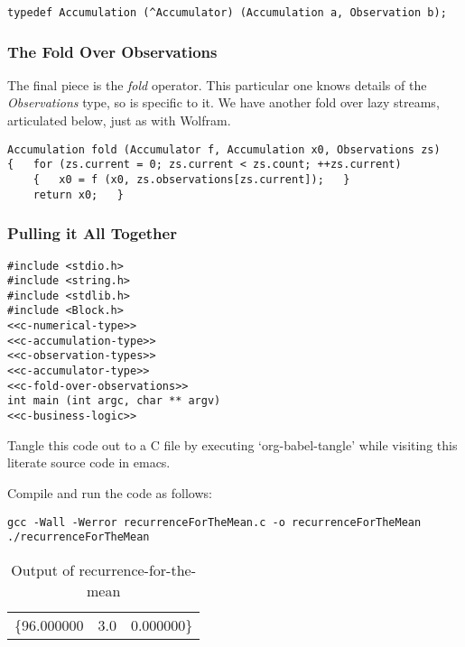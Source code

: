 \documentclass[10pt,oneside,x11names]{article}
\begin{document}
\begin{verbatim}
typedef Accumulation (^Accumulator) (Accumulation a, Observation b);
\end{verbatim}

\subsubsection{The Fold Over Observations}
\label{sec:orgheadline9}

The final piece is the \emph{fold} operator. This particular one knows details of the
\emph{Observations} type, so is specific to it. We have another fold over lazy
streams, articulated below, just as with Wolfram.

\begin{verbatim}
Accumulation fold (Accumulator f, Accumulation x0, Observations zs)
{   for (zs.current = 0; zs.current < zs.count; ++zs.current)
    {   x0 = f (x0, zs.observations[zs.current]);   }
    return x0;   }
\end{verbatim}

\subsubsection{Pulling it All Together}
\label{sec:orgheadline10}

\begin{verbatim}
#include <stdio.h>
#include <string.h>
#include <stdlib.h>
#include <Block.h>
<<c-numerical-type>>
<<c-accumulation-type>>
<<c-observation-types>>
<<c-accumulator-type>>
<<c-fold-over-observations>>
int main (int argc, char ** argv)
<<c-business-logic>>
\end{verbatim}

Tangle this code out to a C file by executing `org-babel-tangle' while
visiting this literate source code in emacs.

Compile and run the code as follows:

\begin{verbatim}
gcc -Wall -Werror recurrenceForTheMean.c -o recurrenceForTheMean
./recurrenceForTheMean
\end{verbatim}

\begin{table}[htb]
\caption{Output of recurrence-for-the-mean}
\centering
\begin{tabular}{lrl}
\{96.000000 & 3.0 & 0.000000\}\\
\end{tabular}
\end{table}
\end{document}
